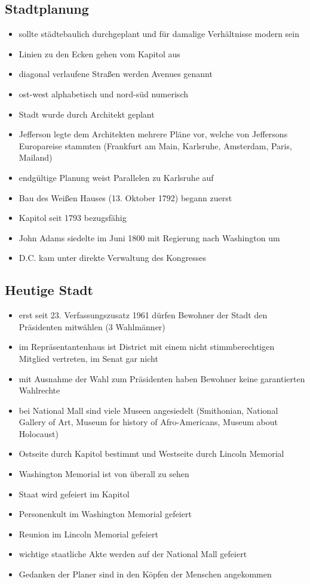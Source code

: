 \documentclass[10pt,a4paper,oneside,ngerman,numbers=noenddot]{scrartcl}
\newenvironment{myitemize}{\begin{itemize}\itemsep -9pt}{\end{itemize}} %
\begin{document}
\subsection*{Stadtplanung}
\begin{myitemize}
    \item sollte städtebaulich durchgeplant und für damalige Verhältnisse
          modern sein
    \item Linien zu den Ecken gehen vom Kapitol aus
    \item diagonal verlaufene Straßen werden Avenues genannt
    \item ost-west alphabetisch und nord-süd numerisch
    \item Stadt wurde durch Architekt geplant
    \item Jefferson legte dem Architekten mehrere Pläne vor, welche von Jeffersons Europareise stammten 
          (Frankfurt am Main, Karlsruhe, Amsterdam, Paris, Mailand) 
    \item endgültige Planung weist Parallelen zu Karlsruhe auf
    \item Bau des Weißen Hauses (13. Oktober 1792) begann zuerst
    \item Kapitol seit 1793 bezugsfähig
    \item John Adams siedelte im Juni 1800 mit Regierung nach Washington um
    \item D.C. kam unter direkte Verwaltung des Kongresses
\end{myitemize}
\subsection*{Heutige Stadt}
\begin{myitemize}
    \item erst seit 23. Verfassungszusatz 1961 dürfen Bewohner der Stadt
          den Präsidenten mitwählen (3 Wahlmänner)
    \item im Repräsentantenhaus ist District mit einem nicht stimmberechtigen
          Mitglied vertreten, im Senat gar nicht
    \item mit Ausnahme der Wahl zum Präsidenten haben Bewohner keine garantierten
          Wahlrechte
    \item bei National Mall sind viele Museen angesiedelt (Smithonian, National Gallery of Art, Museum for history of Afro-Americans, Museum about Holocaust)
    \item Ostseite durch Kapitol bestimmt und Westseite durch Lincoln Memorial
    \item Washington Memorial ist von überall zu sehen
    \item Staat wird gefeiert im Kapitol
    \item Personenkult im Washington Memorial gefeiert
    \item Reunion im Lincoln Memorial gefeiert 
    \item wichtige staatliche Akte werden auf der National Mall gefeiert
    \item Gedanken der Planer sind in den Köpfen der Menschen angekommen
\end{myitemize}
\end{document}
